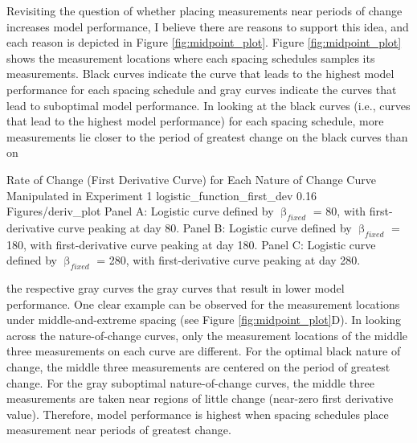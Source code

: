 \documentclass[
12pt, %
twoside,
english]{guelphthesis}
\begin{document}
Revisiting the question of whether placing measurements near periods of change increases model performance, I believe there are reasons to support this idea, and each reason is depicted in Figure \ref{fig:midpoint_plot}. Figure \ref{fig:midpoint_plot} shows the measurement locations where each spacing schedules samples its measurements. Black curves indicate the curve that leads to the highest model performance for each spacing schedule and gray curves indicate the curves that lead to suboptimal model performance. In looking at the black curves (i.e., curves that lead to the highest model performance) for each spacing schedule, more measurements lie closer to the period of greatest change on the black curves than on
\begin{apaFigure}
[portrait]
[samepage]
[0cm]
{Rate of Change (First Derivative Curve) for Each Nature of Change Curve Manipulated in Experiment 1}
{logistic_function_first_dev}
{0.16}
{Figures/deriv_plot}
{Panel A: Logistic curve defined by $\upbeta_{fixed}$ = 80, with first-derivative curve peaking at day 80. Panel B: Logistic curve defined by $\upbeta_{fixed}$ = 180, with first-derivative curve peaking at day 180. Panel C: Logistic curve defined by $\upbeta_{fixed}$ = 280, with first-derivative curve peaking at day 280.}
\end{apaFigure}
\noindent the respective gray curves the gray curves that result in lower model performance. One clear example can be observed for the measurement locations under middle-and-extreme spacing (see Figure \ref{fig:midpoint_plot}D). In looking across the nature-of-change curves, only the measurement locations of the middle three measurements on each curve are different. For the optimal black nature of change, the middle three measurements are centered on the period of greatest change. For the gray suboptimal nature-of-change curves, the middle three measurements are taken near regions of little change (near-zero first derivative value). Therefore, model performance is highest when spacing schedules place measurement near periods of greatest change.
\end{document}
